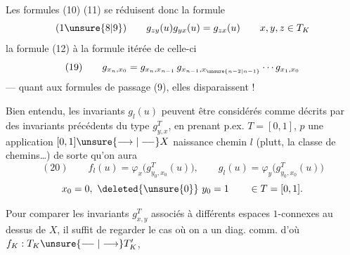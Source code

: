 Les formules (10) (11) se réduisent donc  la formule
\[
(1\unsure{8|9})\qquad g_{zy}(u)g_{yx}(u)=g_{zx}(u)\qquad x,y,z\in T_K
\]
la formule (12) à la formule itérée de celle-ci
\[
(19)\qquad g_{x_n,x_0}=g_{x_n,x_{n-1}}\,g_{x_{n-1},x_{\unsure{n-2|n-1}}}\cdots g_{x_1,x_0}
\]
--- quant aux formules de passage (9), elles  disparaissent !

Bien entendu, les invariants $g_l(u)$  peuvent être considérés comme décrits par des invariants précédents du type $g_{y,x}^T$, en prenant  p.ex. $T=[0,1]$, $p$ une application $[0,1]\unsure{\longrightarrow|\relbar\joinrel\relbar}X$  naissance  chemin $l$ (plutt,  la classe de chemins\ldots) de sorte qu'on aura
\[
(20)\qquad f_l(u)=\varphi_x\bigl(g_{y_0,x_0}^T(u)\bigr),\qquad g_l(u)=\varphi_y\bigl(g_{y_0,x_0}^T(u)\bigr)
\]
\[
x_0=0,\ \deleted{\unsure{0}}\ y_0=1\qquad\in T=[0,1].
\]

Pour comparer les invariants $g_{x,y}^T$ associés à différents espaces $1$-connexes au dessus de $X$, il suffit de regarder le cas où on a un diag. comm.
d'où $f_K:T_K\unsure{\relbar\joinrel\relbar|\longrightarrow}T'_K$,
